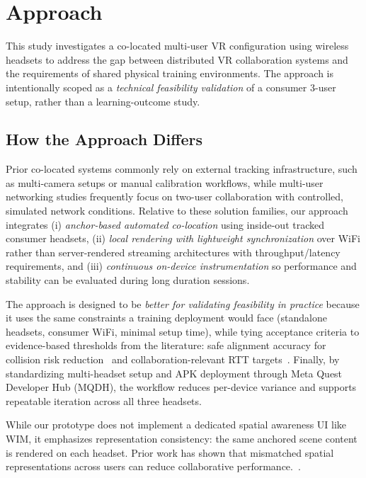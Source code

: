 \section{Approach}

This study investigates a co-located multi-user VR configuration using wireless headsets to address the gap between distributed VR collaboration systems and the requirements of shared physical training environments. The approach is intentionally scoped as a \emph{technical feasibility validation} of a consumer 3-user setup, rather than a learning-outcome study.

\subsection{How the Approach Differs}
Prior co-located systems commonly rely on external tracking infrastructure, such as multi-camera setups or manual calibration workflows, while multi-user networking studies frequently focus on two-user collaboration with controlled, simulated network conditions. Relative to these solution families, our approach integrates (i) \emph{anchor-based automated co-location} using inside-out tracked consumer headsets, (ii) \emph{local rendering with lightweight synchronization} over WiFi rather than server-rendered streaming architectures with throughput/latency requirements, and (iii) \emph{continuous on-device instrumentation} so performance and stability can be evaluated during long duration sessions.

The approach is designed to be \emph{better for validating feasibility in practice} because it uses the same constraints a training deployment would face (standalone headsets, consumer WiFi, minimal setup time), while tying acceptance criteria to evidence-based thresholds from the literature: safe alignment accuracy for collision risk reduction~\cite{ReimerDennis2021CfSV} and collaboration-relevant RTT targets~\cite{VanDammeSam2024Iolo}. Finally, by standardizing multi-headset setup and APK deployment through Meta Quest Developer Hub (MQDH)\cite{MetaMQDHGettingStarted2025}, the workflow reduces per-device variance and supports repeatable iteration across all three headsets.

While our prototype does not implement a dedicated spatial awareness UI like WIM, it emphasizes representation consistency: the same anchored scene content is rendered on each headset. Prior work has shown that mismatched spatial representations across users can reduce collaborative performance.~\cite{WeissYannick2025ItEo}.

